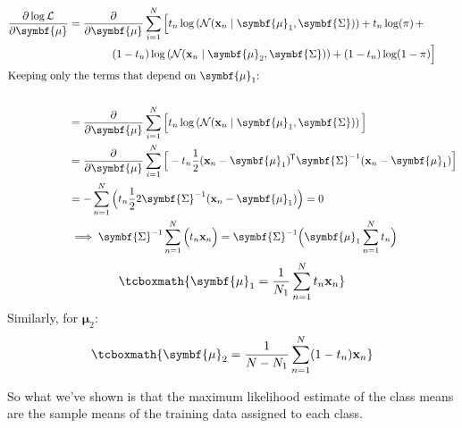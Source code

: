 \documentclass[11pt]{article}
\newcommand{\xb}{\mathbf{x}}
\newcommand{\ub}{\symbf{\mu}}
\newcommand{\Sb}{\symbf{\Sigma}}
\newcommand*{\tran}{^{\mkern-1.5mu\mathsf{T}}}
\begin{document}
\begin{framed}
\begin{align*}
	\frac{\partial \log \mathcal{L}}{\partial \ub} &= \frac{\partial}{\partial \ub}  \sum_{i=1}^{N} \Big[   t_n \log \left(\mathcal{N}(\xb_n \mid \ub_1, \Sb)\right)  + t_n \log(\pi)  \, +  \\
			 & \quad \quad  \quad \quad  (1- t_n) \log \left(\mathcal{N}(\xb_n \mid \ub_2, \Sb)\right)  + (1 - t_n) \log(1 - \pi)  \Big] \\
	\intertext{Keeping only the terms that depend on $\ub_1$:} \\
	&= \frac{\partial}{\partial \ub}  \sum_{i=1}^{N} \Big[   t_n \log \left(\mathcal{N}(\xb_n \mid \ub_1, \Sb)\right)   \Big] \\
	&= \frac{\partial}{\partial \ub}  \sum_{i=1}^{N} \Big[   - t_n  \frac{1}{2} (\xb_n  - \ub_1)\tran \Sb^{-1} (\xb_n  - \ub_1)  \Big] \\
	& = - \sum_{n=1}^{N} \Big(t_n \frac{1}{2}  2  \Sb^{-1} (\xb_n - \ub_1) \Big) = 0 \\
	&\implies \Sb^{-1} \sum_{n=1}^{N} \Big(t_n  \xb_n  \Big) = \Sb^{-1} \Big(  \ub_1  \sum_{n=1}^{N} t_n \Big)
\end{align*}
\begin{equation}
	\tcboxmath{\ub_1 = \frac{1}{N_1} \sum_{n=1}^N t_n \xb_n}
\end{equation}
Similarly, for $\ub_2$:
\begin{equation}
	\tcboxmath{\ub_2 = \frac{1}{N - N_1} \sum_{n=1}^N (1 - t_n) \xb_n}
\end{equation}

So what we've shown is that the maximum likelihood estimate of the class means are the sample means of the training data assigned to each class.


\end{framed}
\end{document}
